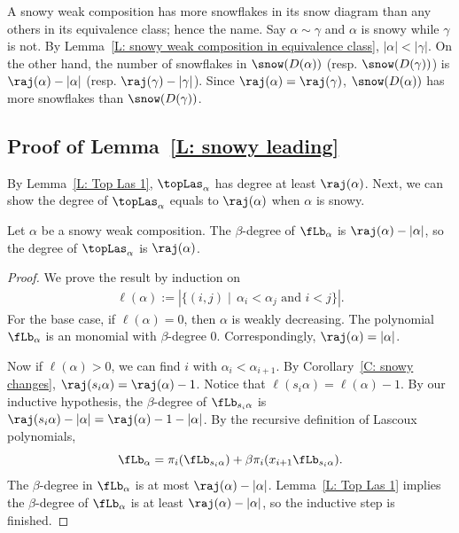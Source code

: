 A snowy weak composition has more snowflakes in its snow diagram 
than any others in its equivalence class; hence the name.
Say $\alpha \sim \gamma$ and
$\alpha$ is snowy while $\gamma$ is not. 
By Lemma~\ref{L: snowy weak composition in equivalence class}, $|\alpha| <  |\gamma|$.
On the other hand, 
the number of snowflakes in $\snow(D(\alpha))$ 
(resp. $\snow(D(\gamma))$)
is $\raj(\alpha) - |\alpha|$ (resp. $\raj(\gamma) - |\gamma|$). 
Since $\raj(\alpha) = \raj(\gamma)$, $\snow(D(\alpha))$
has more snowflakes than $\snow(D(\gamma))$.

\subsection{Proof of Lemma~\ref{L: snowy leading}}
\label{SS: snowy}

By Lemma~\ref{L: Top Las 1},
$\topLas_\alpha$ has degree at least $\raj(\alpha)$.
Next, we can show the degree of $\topLas_\alpha$
equals to $\raj(\alpha)$ when $\alpha$ is snowy. 

\begin{lemma}
\label{L: Snowy degree}
Let $\alpha$ be a snowy weak composition.
The $\beta$-degree of $\fLb_\alpha$ 
is $\raj(\alpha) - |\alpha|$,
so the degree of $\topLas_\alpha$ is $\raj(\alpha)$.
\end{lemma}
\begin{proof}
We prove the result by induction on 
\begin{align*}
\ell(\alpha) := |\{(i,j) \mid\, \alpha_i < \alpha_j \text{ and } i < j\}|.
\end{align*}
For the base case, if $\ell(\alpha) = 0$,
then $\alpha$ is weakly decreasing.
The polynomial $\fLb_\alpha$ is an monomial with $\beta$-degree $0$.
Correspondingly, $\raj(\alpha) = |\alpha|$.

Now if $\ell(\alpha) > 0$,
we can find $i$ with $\alpha_i < \alpha_{i+1}$.
By Corollary~\ref{C: snowy changes},
$\raj(s_i \alpha) = \raj(\alpha) - 1$.
Notice that $\ell(s_i \alpha) = \ell(\alpha) - 1$.
By our inductive hypothesis, 
the $\beta$-degree of $\fLb_{s_i \alpha}$
is $\raj(s_i \alpha) - |\alpha| = \raj(\alpha) - 1 - |\alpha|$.
By the recursive definition of Lascoux polynomials,
$$
\fLb_\alpha 
= \pi_i(\fLb_{s_i\alpha}) + \beta \pi_i(x_{i+1}\fLb_{s_i\alpha}).
$$
The $\beta$-degree in $\fLb_\alpha$
is at most $\raj(\alpha) - |\alpha|$.
Lemma~\ref{L: Top Las 1} implies the 
$\beta$-degree of $\fLb_\alpha$ is at least 
$\raj(\alpha) - |\alpha|$,
so the inductive step is finished.
\end{proof}


